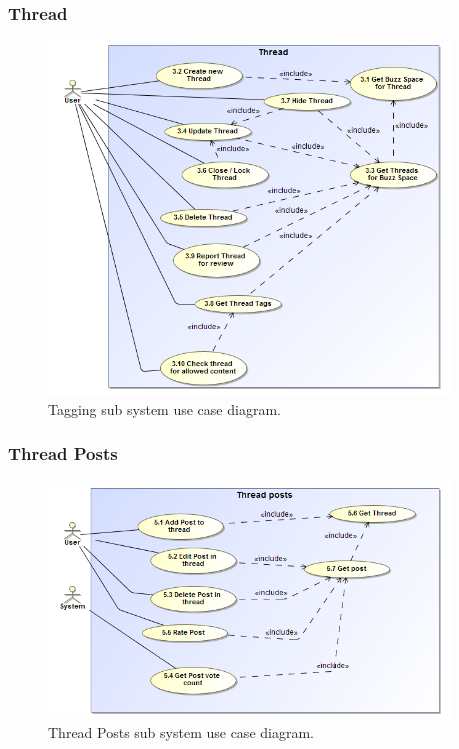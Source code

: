 \documentclass [a4paper,12pt] {article}
\begin{document}
		\subsubsection{Thread}
			\begin{figure}[H]
				\centering
				\includegraphics[width=0.95\textwidth]{ThreadUC.png}
				\caption{Tagging sub system use case diagram.}
			\end{figure}	
		\subsubsection{Thread Posts}
			\begin{figure}[H]
				\centering
				\includegraphics[width=0.95\textwidth]{ThreadPostsUC.png}
				\caption{Thread Posts sub system use case diagram.}
			\end{figure}	
\end{document}
